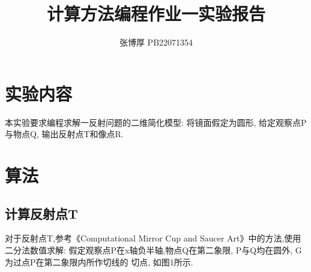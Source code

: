 \documentclass[12pt,a4paper,oneside]{article}
\title{计算方法编程作业一实验报告}
\author{张博厚 PB22071354}
\date{}
\begin{document}
\maketitle

\section{实验内容}
本实验要求编程求解一反射问题的二维简化模型: 将镜面假定为圆形, 给定观察点P与物点Q, 
输出反射点T和像点R.

\section{算法}
\subsection{计算反射点T}
对于反射点T,参考《Computational Mirror Cup and Saucer Art》中的方法,使用二分法数值求解:
假定观察点P在x轴负半轴,物点Q在第二象限, P与Q均在圆外, G为过点P在第二象限内所作切线的
切点, 如图1所示.
\end{document}
